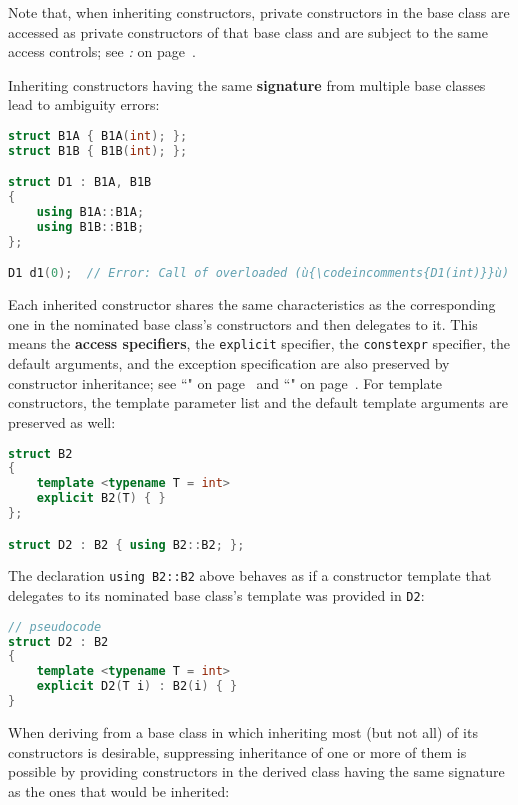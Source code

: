 \noindent Note that, when inheriting constructors, private constructors in the
base class are accessed as private constructors of that base class and
are subject to the same access controls; see \textit{: } on page~\pageref{access-levels-of-inherited-constructors-are-same-as-in-base-class}.

Inheriting constructors having the same \textbf{signature} from multiple
base classes lead to ambiguity errors:

\begin{lstlisting}[language=C++]
struct B1A { B1A(int); };
struct B1B { B1B(int); };

struct D1 : B1A, B1B
{
    using B1A::B1A;
    using B1B::B1B;
};

D1 d1(0);  // Error: Call of overloaded (ù{\codeincomments{D1(int)}}ù) is ambiguous.
\end{lstlisting}
    
\noindent Each inherited constructor shares the same characteristics as the
corresponding one in the nominated base class's constructors and then
delegates to it. This means the \textbf{access specifiers}, the
\texttt{explicit} specifier, the \texttt{constexpr} specifier, the
default arguments, and the exception specification are also preserved by
constructor inheritance; see ``" on page~\pageref{noexcept} and ``" on page~\pageref{constexprfunc}. For template
constructors, the template parameter list and the default template
arguments are preserved as well:

\begin{lstlisting}[language=C++]
struct B2
{
    template <typename T = int>
    explicit B2(T) { }
};

struct D2 : B2 { using B2::B2; };
\end{lstlisting}
    
\noindent The declaration \texttt{using}~\texttt{B2::B2} above behaves as if a
constructor template that delegates to its nominated base class's
template was provided in \texttt{D2}:

\begin{lstlisting}[language=C++]
// pseudocode
struct D2 : B2
{
    template <typename T = int>
    explicit D2(T i) : B2(i) { }
}
\end{lstlisting}
    
\noindent When deriving from a base class in which inheriting most
(but not all) of its constructors is desirable, suppressing
inheritance of one or more of them is possible by providing constructors in the
derived class having the same signature as the ones that would be
inherited:

